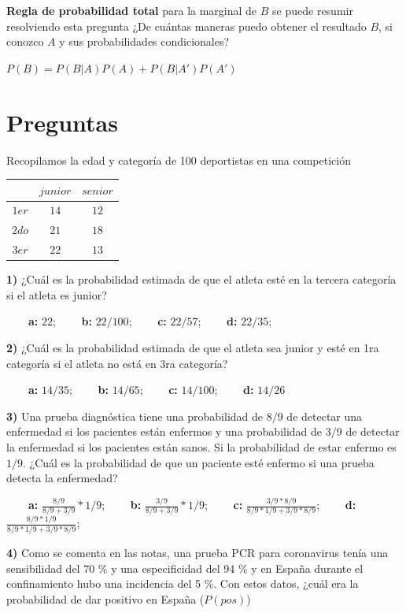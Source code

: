 \documentclass[
]{book}
\begin{document}
\textbf{Regla de probabilidad total} para la marginal de \(B\) se puede resumir resolviendo esta pregunta ¿De cuántas maneras puedo obtener el resultado \(B\), si conozco \(A\) y sus probabilidades condicionales?

\(P(B)=P(B|A)P(A)+P(B|A')P(A')\)

\hypertarget{preguntas-2}{%
\section{Preguntas}\label{preguntas-2}}

Recopilamos la edad y categoría de 100 deportistas en una competición

\begin{longtable}[]{@{}ccc@{}}
\toprule\noalign{}
& \(junior\) & \(senior\) \\
\midrule\noalign{}
\endhead
\bottomrule\noalign{}
\endlastfoot
\(1er\) & \(14\) & \(12\) \\
\(2do\) & \(21\) & \(18\) \\
\(3er\) & \(22\) & \(13\) \\
\end{longtable}

\textbf{1)} ¿Cuál es la probabilidad estimada de que el atleta esté en la tercera categoría si el atleta es junior?

\textbf{\(\qquad\)a:} \(22\); \textbf{\(\qquad\)b:} \(22/100\); \textbf{\(\qquad\)c:} \(22/57\); \textbf{\(\qquad\)d:} \(22/35\);

\textbf{2)} ¿Cuál es la probabilidad estimada de que el atleta sea junior y esté en 1ra categoría si el atleta no está en 3ra categoría?

\textbf{\(\qquad\)a:} \(14/35\); \textbf{\(\qquad\)b:} \(14/65\); \textbf{\(\qquad\)c:} \(14/100\); \textbf{\(\qquad\)d:} \(14/26\)

\textbf{3)} Una prueba diagnóstica tiene una probabilidad de \(8/9\) de detectar una enfermedad si los pacientes están enfermos y una probabilidad de \(3/9\) de detectar la enfermedad si los pacientes están sanos. Si la probabilidad de estar enfermo es \(1/9\). ¿Cuál es la probabilidad de que un paciente esté enfermo si una prueba detecta la enfermedad?

\textbf{\(\qquad\)a:} \(\frac{8/9}{8/9+3/9}*1/9\); \textbf{\(\qquad\)b:} \(\frac{3/9}{8/9+3/9}*1/9\); \textbf{\(\qquad\)c:} \(\frac{3/9*8/9}{8/9*1/9+3/9*8/9}\); \textbf{\(\qquad\)d:} \(\frac{8/9*1/9}{8/9*1/9+3/9*8/9}\);

\textbf{4)} Como se comenta en las notas, una prueba PCR para coronavirus tenía una sensibilidad del 70 \% y una especificidad del 94 \% y en España durante el confinamiento hubo una incidencia del 5 \%. Con estos datos, ¿cuál era la probabilidad de dar positivo en España (\(P(pos)\))
\end{document}
